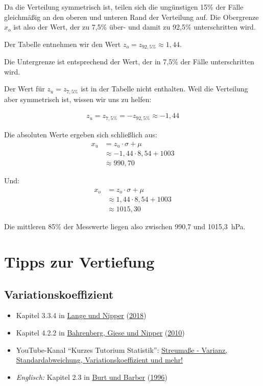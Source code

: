 \documentclass[
  11pt,
  ngerman,
  a4paper,
]{report}
\providecommand{\tightlist}{%
  \setlength{\itemsep}{0pt}\setlength{\parskip}{0pt}}
\begin{document}
Da die Verteilung symmetrisch ist, teilen sich die ungünstigen 15\% der Fälle gleichmäßig an den oberen und unteren Rand der Verteilung auf. Die Obergrenze \(x_o\) ist also der Wert, der zu 7,5\% über- und damit zu 92,5\% unterschritten wird.

Der Tabelle entnehmen wir den Wert \(z_o=z_{92,5\%}\approx1{,}44\).

Die Untergrenze ist entsprechend der Wert, der in 7,5\% der Fälle unterschritten wird.

Der Wert für \(z_u=z_{7{,}5\%}\) ist in der Tabelle nicht enthalten. Weil die Verteilung aber symmetrisch ist, wissen wir uns zu helfen:

\[
  \begin{aligned}
    z_u=z_{7{,}5\%}=-z_{92{,}5\%}\approx-1{,}44
  \end{aligned}
\]

Die absoluten Werte ergeben sich schließlich aus:
\[
  \begin{aligned}
    x_u&=z_u\cdot \sigma + \mu \\
    &\approx-1{,}44 \cdot 8{,}54 + 1003\\
    &\approx990{,}70
  \end{aligned}
\]

Und:
\[
  \begin{aligned}
    x_o&=z_o\cdot \sigma + \mu  \\
    &\approx1{,}44 \cdot 8{,}54 + 1003\\
    & \approx 1015{,}30
  \end{aligned}
\]

Die mittleren 85\% der Messwerte liegen also zwischen 990,7 und 1015,3~hPa.

\hypertarget{tipps-zur-vertiefung-2}{%
\section*{Tipps zur Vertiefung}\label{tipps-zur-vertiefung-2}}

\hypertarget{variationskoeffizient-1}{%
\subsection{Variationskoeffizient}\label{variationskoeffizient-1}}

\begin{itemize}
\tightlist
\item
  Kapitel 3.3.4 in \protect\hyperlink{ref-delange}{Lange und Nipper} (\protect\hyperlink{ref-delange}{2018})
\item
  Kapitel 4.2.2 in \protect\hyperlink{ref-bahrenberg}{Bahrenberg, Giese und Nipper} (\protect\hyperlink{ref-bahrenberg}{2010})
\item
  YouTube-Kanal \enquote{Kurzes Tutorium Statistik}: \href{https://www.youtube.com/watch?v=3oZrS3ZWVcA}{Streumaße - Varianz, Standardabweichung, Variationskoeffizient und mehr!}
\item
  \emph{Englisch:} Kapitel 2.3 in \protect\hyperlink{ref-burt}{Burt und Barber} (\protect\hyperlink{ref-burt}{1996})
\end{itemize}
\end{document}
